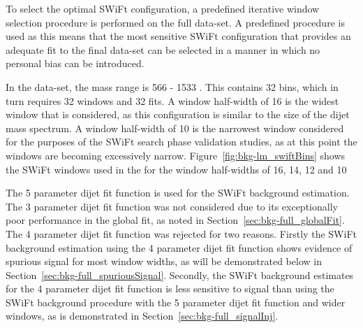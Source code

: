 To select the optimal SWiFt configuration, a predefined iterative window selection procedure is performed on the full \lm{} data-set.
A predefined procedure is used as this means that the most sensitive SWiFt configuration that provides an adequate fit to the final data-set can be selected
in a manner in which no personal bias can be introduced.




In the \lm{} data-set, the mass range is 566 - 1533 \GeV{}. This contains 32 bins, which in turn requires 32 windows and 32 fits.
A window half-width of 16 is  the widest window that is considered,
as this configuration is similar to the size of the dijet mass spectrum.
A window half-width of 10 is the narrowest window considered for the purposes of the SWiFt search phase validation studies,
as at this point the windows are becoming excessively narrow.
Figure~\ref{fig:bkg-lm_swiftBins} shows the SWiFt windows used in the for the window half-widths of 16, 14, 12 and 10

The 5 parameter dijet fit function is used for the SWiFt background estimation.
The 3 parameter dijet fit function was not considered due to its exceptionally poor performance in the global fit, as noted in Section~\ref{sec:bkg-full_globalFit}.
The 4 parameter dijet fit function was rejected for two reasons.
Firstly the SWiFt background estimation using the 4 parameter dijet fit function shows evidence of spurious signal for most window widths,
as will be demonstrated below in Section~\ref{sec:bkg-full_spuriousSignal}.
Secondly, the SWiFt background estimates for the 4 parameter dijet fit function is less sensitive to signal than
using the SWiFt background procedure with the 5 parameter dijet fit function and wider windows, as is demonstrated in Section~\ref{sec:bkg-full_signalInj}.


